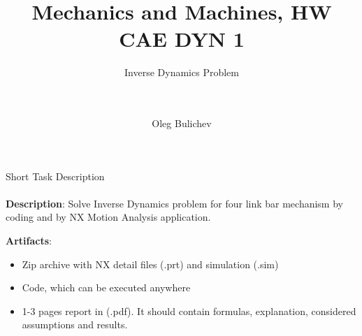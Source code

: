 \documentclass[aspectratio=169]{beamer}
\title[MaM]{Mechanics and Machines, HW CAE DYN 1} %
\subtitle{Inverse Dynamics Problem
\\ \  \\ \ 
         } %
\author{Oleg Bulichev}
\newcommand{\fbckg}[1]{\usebackgroundtemplate{\texttt{[image: \#1]}}}%
\begin{document}
\setlength{\abovedisplayskip}{0pt}
\setlength{\belowdisplayskip}{0pt}
\setlength{\abovedisplayshortskip}{0pt}
\setlength{\belowdisplayshortskip}{0pt}

\fbckg{fibeamer/figs/title_page.png}

\fbckg{fibeamer/figs/common.png}

\note{\scriptsize \begin{itemize}
        \item \
    \end{itemize}}

\note{
   \ 
}

\begin{frame}[t]{Short Task Description}
    \framesubtitle{}
    \textbf{Description}: Solve Inverse Dynamics problem for four link bar mechanism by coding and by NX Motion Analysis application.

    \textbf{Artifacts}: 
    \begin{itemize}
        \item Zip archive with NX detail files (.prt) and simulation (.sim)
        \item Code, which can be executed anywhere
        \item 1-3 pages report in (.pdf). It should contain formulas, explanation, considered assumptions and results.
    \end{itemize}
\end{frame}
\end{document}
